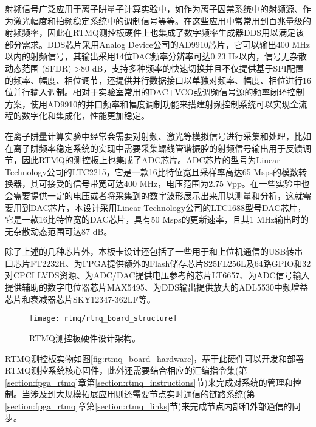 射频信号广泛应用于离子阱量子计算实验中，如作为离子囚禁系统中的射频源、作为激光幅度和拍频稳定系统中的调制信号等等。在这些应用中常常用到百兆量级的射频频率，因此在RTMQ测控板硬件上也集成了数字频率生成器DDS用以满足该部分需求。DDS芯片采用Analog Device公司的AD9910\cite[]{AD9910_2020}芯片，它可以输出400 MHz以内的射频信号，其输出采用14位DAC频率分辨率可达0.23 Hz以内，信号无杂散动态范围 (SFDR) >80 dB，支持多种频率的快速切换并且不仅提供基于SPI配置的频率、幅度、相位调节，还提供并行数据接口以单独对频率、幅度、相位进行16位并行输入调制。相对于实验室常用的DAC+VCO或调频信号源的频率闭环控制方案，使用AD9910的并口频率和幅度调制功能来搭建射频控制系统可以实现全流程的数字化和集成化，性能更加稳定。


在离子阱量计算实验中经常会需要对射频、激光等模拟信号进行采集和处理，比如在离子阱频率稳定系统的实现中需要采集螺线管谐振腔的射频信号输出用于反馈调节，因此RTMQ的测控板上也集成了ADC芯片。ADC芯片的型号为Linear Technology公司的LTC2215\cite[]{ADC_2020}，它是一款16比特位宽且采样率高达65 Msps的模数转换器，其可接受的信号带宽可达400 MHz，电压范围为2.75 Vpp。在一些实验中也会需要提供一定的电压或者将采集到的数字波形展示出来用以测量和分析，这就需要用到DAC芯片，本设计采用Linear Technology公司的LTC1688型号DAC芯片，它是一款16比特位宽的DAC芯片，具有50 Msps的更新速率，且其1 MHz输出时的无杂散动态范围可达87 dB。

除了上述的几种芯片外，本板卡设计还包括了一些用于和上位机通信的USB转串口芯片FT2232H\cite[]{FT2232H_2020}、为FPGA提供额外的Flash储存芯片S25FL256L\cite[]{S25FL256L_2017}及64路GPIO和32对CPCI LVDS资源、为ADC/DAC提供电压参考的芯片LT6657\cite[]{LY6657_2020}、为ADC信号输入提供辅助的数字电位器芯片MAX5495\cite[]{MAX5495_2020}、为DDS输出提供放大的ADL5530\cite[]{ADL5530_2020}中频增益芯片和衰减器芯片SKY12347-362LF\cite[]{SKY12347_2011}等。

\begin{figure}
    \centering
    \texttt{[image: rtmq/rtmq\_board\_structure]}
    \caption[RTMQ测控板硬件设计架构]{RTMQ测控板硬件设计架构。\label{fig:rtmq_board_structure}}
\end{figure}



RTMQ测控板实物如图\ref{fig:rtmq_board_hardware}，基于此硬件可以开发和部署RTMQ测控系统核心固件，此外还需要结合相应的汇编指令集(第\ref{section:fpga_rtmq}章第\ref{section:rtmq_instructions}节)来完成对系统的管理和控制\cite[]{junhua03}。当涉及到大规模拓展应用则还需要节点实时通信的链路系统(第\ref{section:fpga_rtmq}章第\ref{section:rtmq_links}节)来完成节点内部和外部通信的同步\cite[]{junhua02}。


